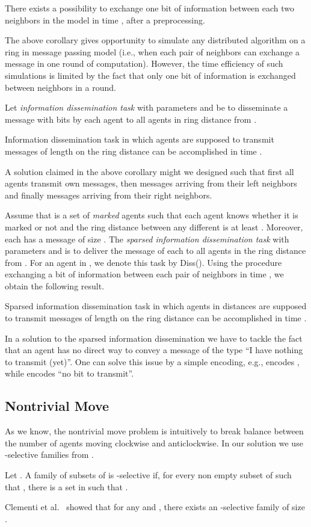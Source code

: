 \begin{corollary}
There exists a possibility to exchange one bit of information
between each two neighbors in the {\perceptive} model  in time , after a  preprocessing.
\end{corollary}

The above corollary gives opportunity to simulate any distributed algorithm on a ring
in message passing model (i.e., when each pair of neighbors can exchange a message in
one round of computation).
However, the time efficiency of such simulations is limited by the fact that only one bit
of information is exchanged between neighbors in a round.


Let {\em information dissemination task} with parameters  and  be to disseminate
a message  with  bits by each agent  to all agents in ring distance 
from .
\begin{corollary}
Information dissemination task in which agents are supposed
to transmit messages of length  on the ring distance  can be accomplished in time .
\end{corollary}
A solution claimed in the above corollary might we designed such that
first all agents transmit own messages, then messages arriving from their left neighbors and finally messages arriving from their right
neighbors.

Assume that  is a set of {\em marked} agents such that each agent
knows whether it is marked or not and the ring distance between any different 
is at least . Moreover, each  has a message  of size .
The {\em sparsed information dissemination task} with parameters  and 
is to deliver the message of each  to all agents in the ring distance
 from . 
For an agent in , we denote this task by Diss().
Using the procedure exchanging a bit of information between
each pair of neighbors in time , we obtain the following result.
\begin{corollary}
Sparsed information dissemination task in which agents in distances  are supposed
to transmit messages of length  on the ring distance  can be accomplished in time .
\end{corollary}
In a solution to the sparsed information dissemination we have to tackle
the fact that an agent has no direct way to convey a message of the type ``I have nothing to transmit (yet)''. One can solve this issue by a simple encoding, e.g.,  encodes , while  encodes ``no bit to transmit''.

\subsection{Nontrivial Move}
As we know, the nontrivial move problem is intuitively to break balance between the number
of agents moving clockwise and anticlockwise.
In our solution we use -selective families from \cite{ClementiMS03}.
\begin{definition}
Let . A family  of subsets of  is 
-selective if, for every non empty subset  of  such that , there is a
set  in  such that .
\end{definition}
Clementi et al.\ \cite{ClementiMS03} showed that 
for any  and , there exists an -selective family of size
.

